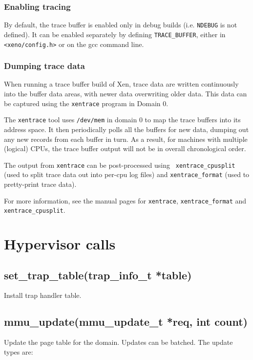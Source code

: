 \documentclass[11pt,twoside,final,openright]{xenstyle}
\begin{document}
\subsection{Enabling tracing}

By default, the trace buffer is enabled only in debug builds (i.e. {\tt NDEBUG}
is not defined).  It can be enabled separately by defining {\tt TRACE\_BUFFER},
either in {\tt <xeno/config.h>} or on the gcc command line.

\subsection{Dumping trace data}

When running a trace buffer build of Xen, trace data are written continuously
into the buffer data areas, with newer data overwriting older data.  This data
can be captured using the {\tt xentrace} program in Domain 0.

The {\tt xentrace} tool uses {\tt /dev/mem} in domain 0 to map the trace
buffers into its address space.  It then periodically polls all the buffers for
new data, dumping out any new records from each buffer in turn.  As a result,
for machines with multiple (logical) CPUs, the trace buffer output will not be
in overall chronological order.

The output from {\tt xentrace} can be post-processed using {\tt
xentrace\_cpusplit} (used to split trace data out into per-cpu log files) and
{\tt xentrace\_format} (used to pretty-print trace data).

For more information, see the manual pages for {\tt xentrace},
{\tt xentrace\_format} and {\tt xentrace\_cpusplit}.


\chapter{Hypervisor calls}

\section{ set\_trap\_table(trap\_info\_t *table)} 

Install trap handler table.

\section{ mmu\_update(mmu\_update\_t *req, int count)} 
Update the page table for the domain. Updates can be batched.
The update types are: 
\end{document}
